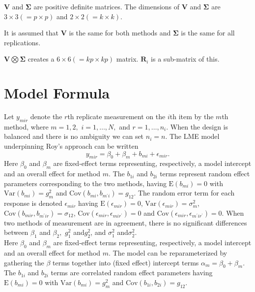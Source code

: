 \documentclass[12pt, a4paper]{report}
\theoremstyle{plain}
\theoremstyle{definition}
\theoremstyle{remark}
\begin{document}
$\boldsymbol{V}$ and $\boldsymbol{\Sigma}$ are positive
definite matrices. The dimensions of $\boldsymbol{V}$ and
$\boldsymbol{\Sigma}$ are $3 \times 3 ( = p \times p )$ and $ 2 \times
2 (= k \times k)$.\\
\bigskip


It is assumed that $\boldsymbol{V}$ is the same for both methods and $\boldsymbol{\Sigma}$ is
the same for all replications.\\
\bigskip

$\boldsymbol{V} \bigotimes \boldsymbol{\Sigma}$ creates a $ 6 \times 6 ( = kp \times
kp)$ matrix.
$\boldsymbol{R}_{i}$ is a sub-matrix of this.\\
\bigskip



\section{Model Formula}

Let $y_{mir} $ denote the $r$th replicate measurement on the $i$th item by the $m$th method, where $m=1,2,$ $i=1,\ldots,N,$ and $r = 1,\ldots,n_i.$ When the design is balanced and there is no ambiguity we can set $n_i=n.$ The LME model underpinning Roy's approach can be written
\begin{equation}\label{Roy-model}
y_{mir} = \beta_{0} + \beta_{m} + b_{mi} + \epsilon_{mir}.
\end{equation}
Here $\beta_0$ and $\beta_m$ are fixed-effect terms representing, respectively, a model intercept and an overall effect for method $m.$ The $b_{1i}$ and $b_{2i}$ terms represent random effect parameters corresponding to the two methods, having $\mathrm{E}(b_{mi})=0$ with $\mathrm{Var}(b_{mi})=g^2_m$ and $\mathrm{Cov}(b_{mi}, b_{m^\prime i})=g_{12}.$ The random error term for each response is denoted $\epsilon_{mir}$ having $\mathrm{E}(\epsilon_{mir})=0$, $\mathrm{Var}(\epsilon_{mir})=\sigma^2_m$, $\mathrm{Cov}(b_{mir}, b_{m^\prime ir})=\sigma_{12}$, $\mathrm{Cov}(\epsilon_{mir}, \epsilon_{mir^\prime})= 0$ and $\mathrm{Cov}(\epsilon_{mir}, \epsilon_{m^\prime ir^\prime})= 0.$
When two methods of measurement are in agreement, there is no significant differences between $\beta_1$ and $\beta_2,$ $g^2_1 $ and$ g^2_2$, and $\sigma^2_1 $ and$ \sigma^2_2$.\\
\bigskip
Here $\beta_0$ and $\beta_m$ are fixed-effect terms representing, respectively, a model intercept and an overall effect for method $m.$ The model can be reparameterized by gathering the $\beta$ terms together into (fixed effect) intercept terms $\alpha_m=\beta_0+\beta_m.$ The $b_{1i}$ and $b_{2i}$ terms are correlated random effect parameters having $\mathrm{E}(b_{mi})=0$ with $\mathrm{Var}(b_{mi})=g^2_m$ and $\mathrm{Cov}(b_{1i}, b_{2 i})=g_{12}.$ \\
\bigskip
\end{document}
